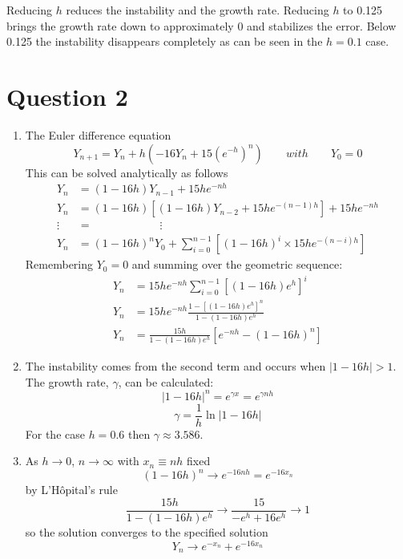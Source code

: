 \documentclass[a4paper]{article}
\begin{document}
Reducing $h$ reduces the instability and the growth rate. Reducing $h$ to 0.125 brings the growth rate down to approximately 0 and stabilizes the error. Below 0.125 the instability disappears completely as can be seen in the $h=0.1$ case. 

\section*{Question 2}

\renewcommand{\labelenumi}{\roman{enumi}}
\begin{enumerate}
\item
	The Euler difference equation
	\[ Y_{n+1} = Y_n + h(-16Y_n + 15(e^{-h})^n) \qquad with \qquad Y_0=0 \]
    This can be solved analytically as follows
    \begin{align*}
    Y_n &= (1-16h)Y_{n-1} + 15he^{-nh} \\
    Y_n &= (1-16h)[(1-16h)Y_{n-2} + 15he^{-(n-1)h}] + 15he^{-nh} \\
    \vdots \enspace &= \qquad\qquad\qquad \vdots \\
    Y_n &= (1-16h)^nY_0 + \sum_{i=0}^{n-1}[(1-16h)^i \times 15he^{-(n-i)h}]
    \end{align*}
    Remembering $Y_0=0$ and summing over the geometric sequence:
    \begin{align*}
    Y_n &= 15he^{-nh}\sum_{i=0}^{n-1}[(1-16h)e^h]^i \\
    Y_n &= 15he^{-nh} \frac{1-[(1-16h)e^h]^n}{1-(1-16h)e^h} \\
    Y_n &= \frac{15h}{1-(1-16h)e^h} [e^{-nh} - (1-16h)^n]
    \end{align*}
\item
    The instability comes from the second term and occurs when $|1-16h|>1$. The growth rate, $\gamma$, can be calculated:
    \[ |1-16h|^n = e^{\gamma x} = e^{\gamma nh} \]
    \[ \gamma = \frac{1}{h}\ln|1-16h| \]
    For the case $h=0.6$ then $\gamma \approx 3.586$.
\item
    As $h \rightarrow 0$, $n \rightarrow \infty$ with $x_n \equiv nh$ fixed
    \[ (1-16h)^n \rightarrow e^{-16nh} = e^{-16x_n} \]
    by L'Hôpital's rule
    \[ \frac{15h}{1 - (1-16h)e^h} \rightarrow \frac{15}{-e^h+16e^h} \rightarrow 1 \]
    so the solution converges to the specified solution
    \[ Y_n \rightarrow e^{-x_n} + e^{-16x_n} \]
\end{enumerate}
\end{document}
